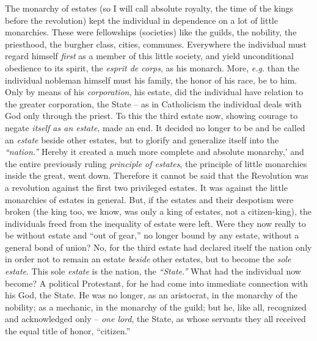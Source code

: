 \documentclass[12pt,a4paper]{book}
\begin{document}
The monarchy of estates (so I will call absolute royalty, the time of the 
kings before the revolution) kept the individual in dependence on a lot of 
little monarchies. These were fellowships (societies) like the guilds, the 
nobility, the priesthood, the burgher class, cities, communes. Everywhere the 
individual must regard himself \textit{first} as a member of this little 
society, and yield unconditional obedience to its spirit, the \textit{esprit 
de corps}, as his monarch. More, \textit{e.g.} than the individual nobleman 
himself must his family, the honor of his race, be to him. Only by means of 
his \textit{corporation}, his estate, did the individual have relation to the 
greater corporation, the State -- as in Catholicism the individual deals with 
God only through the priest. To this the third estate now, showing courage to 
negate \textit{itself as an estate}, made an end. It decided no longer to be 
and be called an \textit{estate} beside other estates, but to glorify and 
generalize itself into the \textit{``nation.''} Hereby it created a much 
more complete and absolute monarchy,' and the entire previously ruling 
\textit{principle of estates}, the principle of little monarchies inside the 
great, went down. Therefore it cannot be said that the Revolution was a 
revolution against the first two privileged estates. It was against the little 
monarchies of estates in general. But, if the estates and their despotism were 
broken (the king too, we know, was only a king of estates, not a 
citizen-king), the individuals freed from the inequality of estate were left. 
Were they now really to be without estate and ``out of gear,'' no longer 
bound by any estate, without a general bond of union? No, for the third estate 
had declared itself the nation only in order not to remain an estate 
\textit{beside} other estates, but to become the \textit{sole estate}. This 
sole \textit{estate} is the nation, the \textit{``State.''} What had the 
individual now become? A political Protestant, for he had come into immediate 
connection with his God, the State. He was no longer, as an aristocrat, in the 
monarchy of the nobility; as a mechanic, in the monarchy of the guild; but he, 
like all, recognized and acknowledged only -- \textit{one lord}, the State, as 
whose servants they all received the equal title of honor, ``citizen.''
\end{document}
